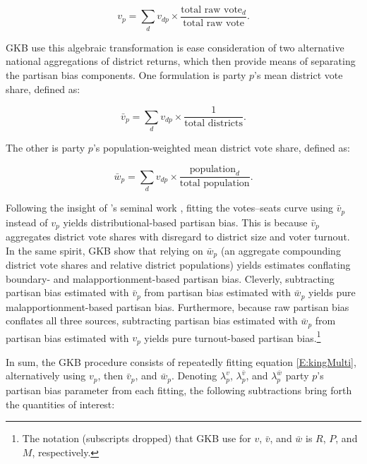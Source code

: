 \documentclass[letter,12pt]{article}
\begin{document}
\begin{equation}
v_p  = \sum_d v_{dp} \times \frac{\text{total raw vote}_d}{\text{total raw vote}}.  %
\end{equation}

\noindent GKB use this algebraic transformation is ease consideration of two alternative national aggregations of district returns, which then provide means of separating the partisan bias components. One formulation is party $p$'s mean district vote share, defined as:

\begin{equation}
\bar{v}_p  = \sum_d v_{dp} \times \frac{1}{\text{total districts}}. %
\end{equation}

\noindent The other is party $p$'s population-weighted mean district vote share, defined as:

\begin{equation}
\bar{w}_p  = \sum_d v_{dp} \times \frac{\text{population}_d}{\text{total population}}. %
\end{equation}


Following the insight of \citeauthor{tufte1973seatsVotes}'s \citeyearpar{tufte1973seatsVotes} seminal work \citep[further elaborated in][]{gelman.king.1994EvalElSysRedis}, fitting the votes--seats curve using $\bar{v}_p$ instead of $v_p$ yields distributional-based partisan bias. This is because $\bar{v}_p$ aggregates district vote shares with disregard to district size and voter turnout. In the same spirit, GKB show that relying on $\bar{w}_p$ (an aggregate compounding district vote shares and relative district populations) yields estimates conflating boundary- and malapportionment-based partisan bias. Cleverly, subtracting partisan bias estimated with $\bar{v}_p$ from partisan bias estimated with $\bar{w}_p$ yields pure malapportionment-based partisan bias. Furthermore, because raw partisan bias conflates all three sources, subtracting partisan bias estimated with $\bar{w}_p$ from partisan bias estimated with $v_p$ yields pure turnout-based partisan bias.\footnote{The notation (subscripts dropped) that GKB use for $v$, $\bar{v}$, and $\bar{w}$ is $R$, $P$, and $M$, respectively.}  

In sum, the GKB procedure consists of repeatedly fitting equation \ref{E:kingMulti}, alternatively using $v_p$, then $\bar{v}_p$, and $\bar{w}_p$. Denoting $\lambda_p^v$, $\lambda_p^{\bar{v}}$, and $\lambda_p^{\bar{w}}$ party $p$'s partisan bias parameter from each fitting, the following subtractions bring forth the quantities of interest: 
\end{document}
